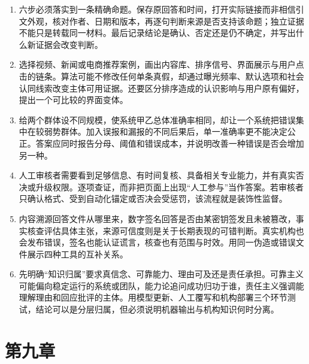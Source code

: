 \begin{enumerate}
\item 六步必须落实到一条精确命题。保存原回答和时间，打开实际链接而非相信引文外观，核对作者、日期和版本，再逐句判断来源是否支持该命题；独立证据不能只是转载同一材料。最后记录结论是确认、否定还是仍不确定，并写出什么新证据会改变判断。
\item 选择视频、新闻或电商推荐案例，画出内容库、排序信号、界面展示与用户点击的链条。算法可能不修改任何单条真假，却通过曝光频率、默认选项和社会认同线索改变主体可用证据。还要区分排序造成的认识影响与用户原有偏好，提出一个可比较的界面变体。
\item 给两个群体设不同规模，使系统甲乙总体准确率相同，却让一个系统把错误集中在较弱势群体。加入误报和漏报的不同后果后，单一准确率更不能决定公正。答案应同时报告分母、阈值和错误成本，并说明改善一种错误是否会增加另一种。
\item 人工审核者需要看到足够信息、有时间复核、具备相关专业能力，并有真实否决或升级权限。逐项查证，而非把页面上出现“人工参与”当作答案。若审核者只确认格式、受到自动化锚定或否决会受惩罚，该流程就是装饰性监督。
\item 内容溯源回答文件从哪里来，数字签名回答是否由某密钥签发且未被篡改，事实核查评估具体主张，来源可信度则是关于长期表现的可错判断。真实机构也会发布错误，签名也能认证谎言，核查也有范围与时效。用同一伪造或错误文件展示四种工具的互补关系。
\item 先明确“知识归属”要求真信念、可靠能力、理由可及还是责任承担。可靠主义可能偏向稳定运行的系统或团队，能力论追问成功归功于谁，责任主义强调能理解理由和回应批评的主体。用模型更新、人工覆写和机构部署三个环节测试，结论可以是分层归属，但必须说明机器输出与机构知识何时分离。
\end{enumerate}

\section*{第九章}

